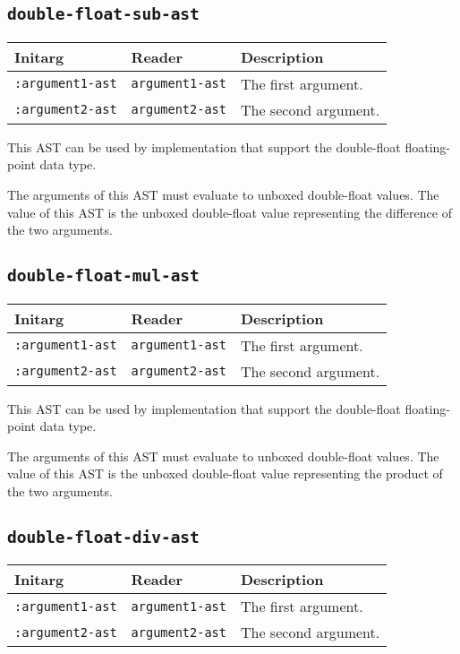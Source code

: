 \subsection{\texttt{double-float-sub-ast}}
\label{sec-ast-double-float-sub}

\begin{tabular}{|l|l|l|}
\hline
Initarg & Reader & Description\\
\hline\hline
\texttt{:argument1-ast} & \texttt{argument1-ast} & The first argument.\\
\hline
\texttt{:argument2-ast} & \texttt{argument2-ast} & The second argument.\\
\hline
\end{tabular}

This AST can be used by implementation that support the double-float
floating-point data type.  

The arguments of this AST must evaluate to unboxed double-float
values.  The value of this AST is the unboxed double-float value
representing the difference of the two arguments.

\subsection{\texttt{double-float-mul-ast}}
\label{sec-ast-double-float-mul}

\begin{tabular}{|l|l|l|}
\hline
Initarg & Reader & Description\\
\hline\hline
\texttt{:argument1-ast} & \texttt{argument1-ast} & The first argument.\\
\hline
\texttt{:argument2-ast} & \texttt{argument2-ast} & The second argument.\\
\hline
\end{tabular}

This AST can be used by implementation that support the double-float
floating-point data type.  

The arguments of this AST must evaluate to unboxed double-float
values.  The value of this AST is the unboxed double-float value
representing the product of the two arguments.

\subsection{\texttt{double-float-div-ast}}
\label{sec-ast-double-float-div}

\begin{tabular}{|l|l|l|}
\hline
Initarg & Reader & Description\\
\hline\hline
\texttt{:argument1-ast} & \texttt{argument1-ast} & The first argument.\\
\hline
\texttt{:argument2-ast} & \texttt{argument2-ast} & The second argument.\\
\hline
\end{tabular}

